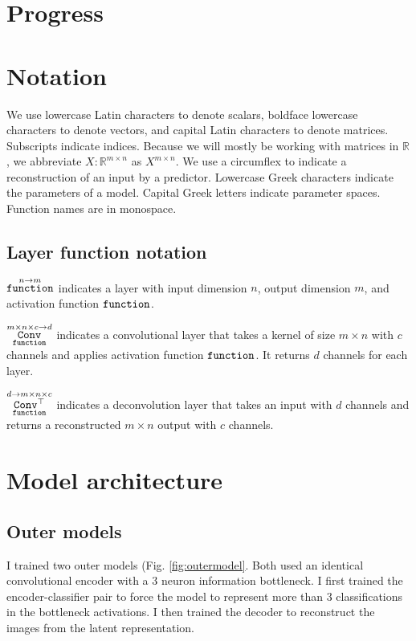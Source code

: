 
\section{Progress}
\label{app:progress}







\section{Notation}
\label{app:notation}
We use lowercase Latin characters to denote scalars, boldface lowercase characters to denote vectors, and capital Latin characters to denote matrices.
Subscripts indicate indices.
Because we will mostly be working with matrices in $\mathbb{R}$, we abbreviate $X : \mathbb{R}^{m \times n}$ as $X^{m \times n}$.
We use a circumflex to indicate a reconstruction of an input by a predictor.
Lowercase Greek characters indicate the parameters of a model.
Capital Greek letters indicate parameter spaces.
Function names are in monospace.

\subsection{Layer function notation}
$\mathop{\mathtt{function}}\limits^{n \to m}$ indicates a layer with input dimension $n$, output dimension $m$, and activation function $\mathop{\mathtt{function}}\limits$.

$\mathop{\mathtt{Conv}}\limits^{m \times n \times c \to d}_{\mathop{\mathtt{function}}\limits}$ indicates a convolutional layer that takes a kernel of size 
$m \times n$ with $c$ channels and applies activation function $\mathop{\mathtt{function}}\limits$. 
It returns $d$ channels for each layer.

$\mathop{\mathtt{Conv^\top}}\limits^{d \to m \times n \times c}_{\mathop{\mathtt{function}}\limits}$ indicates a deconvolution layer that takes an input with $d$ channels and returns a reconstructed $m \times n$ output with $c$ channels.

\section{Model architecture}

\subsection{Outer models}
\label{app:outer}
I trained two outer models (Fig. \ref{fig:outermodel}.
Both used an identical convolutional encoder with a 3 neuron information bottleneck.
I first trained the encoder-classifier pair to force the model to represent more than 3 classifications in the bottleneck activations.
I then trained the decoder to reconstruct the images from the latent representation. 

